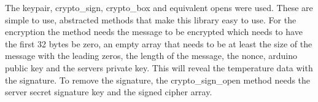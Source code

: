 The keypair, crypto\_sign, crypto\_box and equivalent opens were used. These are simple to use, abstracted methods that make this library easy to use. For the encryption the method needs the message to be encrypted which needs to have the first 32 bytes be zero, an empty array that needs to be at least the size of the message with the leading zeros, the length of the message, the nonce, arduino public key and the servers private key. This will reveal the temperature data with the signature. To remove the signature, the crypto\_sign\_open method needs the server secret signature key and the signed cipher array.

